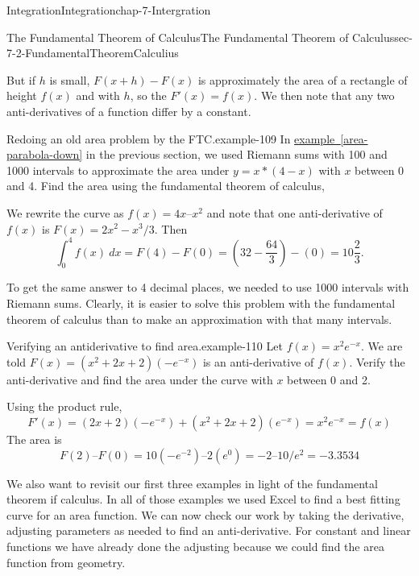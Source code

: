 \documentclass[oneside,10pt,]{book}
\numberwithin{equation}{section}
\begin{document}
\begin{chapterptx}{Integration}{}{Integration}{}{}{chap-7-Intergration}
\begin{sectionptx}{The Fundamental Theorem of Calculus}{}{The Fundamental Theorem of Calculus}{}{}{sec-7-2-FundamentalTheoremCalculius}
\begin{sidebyside}{1}{0.15}{0.15}{0}
\begin{sbspanel}{0.7}
\end{sbspanel}%
\end{sidebyside}%
\par
\hypertarget{p-2643}{}%
But if \(h\) is small, \(F(x+h)-F(x)\) is approximately the area of a rectangle of height \(f(x)\) and with \(h\), so the \(F'(x) = f(x)\).  We then note that any two anti-derivatives of a function differ by a constant.%
\begin{example}{Redoing an old area problem by the  FTC.}{example-109}%
\hypertarget{p-2644}{}%
In \hyperref[area-parabola-down]{example~\ref{area-parabola-down}} in the previous section, we used Riemann sums with 100 and 1000 intervals to approximate the area under \(y = x*(4-x)\) with \(x\) between 0 and 4.  Find the area using the fundamental theorem of calculus,%
\par
\hypertarget{p-2645}{}%
We rewrite the curve as \(f(x) = 4x – x^2\) and note that one anti-derivative of \(f(x)\) is \(F(x) = 2 x^2 - x^3/3\).  Then%
%
\begin{equation*}
\int_0^4 f(x)\ dx=F(4)-F(0)=\left(32-\frac{64}{3}\right)-(0)=10 \frac{2}{3}.
\end{equation*}
\end{example}
\hypertarget{p-2646}{}%
To get the same answer to 4 decimal places, we needed to use 1000 intervals with Riemann sums.  Clearly, it is easier to solve this problem with the fundamental theorem of calculus than to make an approximation with that many intervals.%
\begin{example}{Verifying an antiderivative to find area.}{example-110}%
\hypertarget{p-2647}{}%
Let \(f(x)=x^2 e^{-x}\).  We are told \(F(x)=(x^2+2 x+2) (-e^{-x})\)  is an anti-derivative of \(f(x)\).  Verify the anti-derivative and find the area under the curve with \(x\) between 0 and 2.%
\par
\hypertarget{p-2648}{}%
Using the product rule,%
%
\begin{equation*}
F'(x)=(2x+2) (-e^{-x}) + (x^2+2x+2) (e^{-x})=x^2 e^{-x}=f(x)
\end{equation*}
\hypertarget{p-2649}{}%
The area is%
%
\begin{equation*}
F(2) – F(0) = 10(-e^{-2}) – 2(e^{0}) = -2 – 10/e^2 = -3.3534
\end{equation*}
\end{example}
\hypertarget{p-2650}{}%
We also want to revisit our first three examples in light of the fundamental theorem if calculus.  In all of those examples we used Excel to find a best fitting curve for an area function.  We can now check our work by taking the derivative, adjusting parameters as needed to find an anti-derivative.  For constant and linear functions we have already done the adjusting because we could find the area function from geometry.%

\end{sectionptx}
\end{chapterptx}
\end{document}
